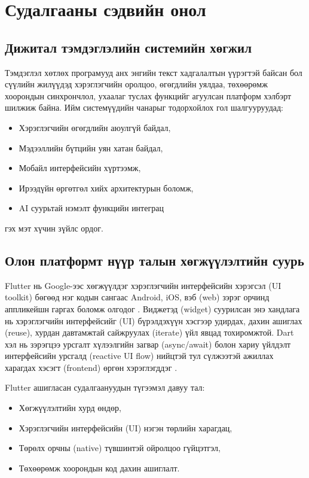 \chapter{Судалгааны сэдвийн онол}
\label{ch:literature}

\section{Дижитал тэмдэглэлийн системийн хөгжил}

Тэмдэглэл хөтлөх програмууд анх энгийн текст хадгалалтын үүрэгтэй байсан бол сүүлийн жилүүдэд хэрэглэгчийн оролцоо, өгөгдлийн уялдаа, төхөөрөмж хоорондын синхрончлол, ухаалаг туслах функцийг агуулсан платформ хэлбэрт шилжиж байна. Ийм системүүдийн чанарыг тодорхойлох гол шалгууруудад:

\begin{itemize}
    \item Хэрэглэгчийн өгөгдлийн аюулгүй байдал,
    \item Мэдээллийн бүтцийн уян хатан байдал,
    \item Мобайл интерфейсийн хүртээмж,
    \item Ирээдүйн өргөтгөл хийх архитектурын боломж,
    \item AI суурьтай нэмэлт функцийн интеграц
\end{itemize}

гэх мэт хүчин зүйлс ордог.

\section{Олон платформт нүүр талын хөгжүүлэлтийн суурь}

Flutter нь Google-ээс хөгжүүлдэг хэрэглэгчийн интерфейсийн хэрэгсэл (UI toolkit) бөгөөд нэг кодын сангаас Android, iOS, вэб (web) зэрэг орчинд аппликейшн гаргах боломж олгодог \cite{flutter_docs}. Виджетэд (widget) суурилсан энэ хандлага нь хэрэглэгчийн интерфейсийг (UI) бүрэлдэхүүн хэсгээр удирдах, дахин ашиглах (reuse), хурдан давтамжтай сайжруулах (iterate) үйл явцад тохиромжтой. Dart хэл нь зэрэгцээ урсгалт хүлээлгийн загвар (async/await) болон хариу үйлдэлт интерфейсийн урсгалд (reactive UI flow) нийцтэй тул сүлжээтэй ажиллах харагдах хэсэгт (frontend) өргөн хэрэглэгддэг \cite{dart_docs}.

Flutter ашигласан судалгаануудын түгээмэл давуу тал:

\begin{itemize}
    \item Хөгжүүлэлтийн хурд өндөр,
    \item Хэрэглэгчийн интерфейсийн (UI) нэгэн төрлийн харагдац,
    \item Төрөлх орчны (native) түвшинтэй ойролцоо гүйцэтгэл,
    \item Төхөөрөмж хоорондын код дахин ашиглалт.
\end{itemize}

